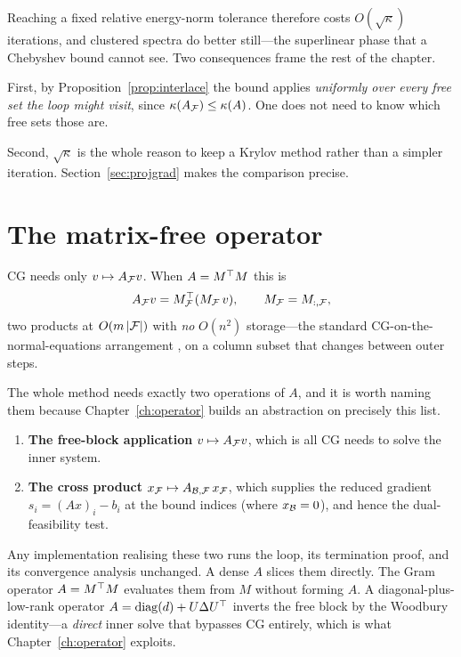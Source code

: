 Reaching a fixed relative energy-norm tolerance therefore costs $O(\sqrt\kappa)$
iterations, and clustered spectra do better still---the superlinear phase that a
Chebyshev bound cannot see. Two consequences frame the rest of the chapter.

First, by Proposition~\ref{prop:interlace} the bound applies \emph{uniformly over
every free set the loop might visit}, since $\kappa(A_{\mathcal{F}}) \le \kappa(A)$. One
does not need to know which free sets those are.

Second, $\sqrt\kappa$ is the whole reason to keep a Krylov method rather than a
simpler iteration. Section~\ref{sec:projgrad} makes the comparison precise.

\section{The matrix-free operator}
\label{sec:operator-two}

CG needs only $v \mapsto A_{\mathcal{F}} v$. When $A = M^{\top} M$ this is
\[
  A_{\mathcal{F}} v = M_{\mathcal{F}}^{\top}(M_{\mathcal{F}}\,v), \qquad M_{\mathcal{F}} = M_{:,\mathcal{F}},
\]
two products at $O(m\,|\mathcal{F}|)$ with \emph{no} $O(n^2)$ storage---the standard
CG-on-the-normal-equations arrangement \cite{golub2013,paige1975}, on a column
subset that changes between outer steps.

The whole method needs exactly two operations of $A$, and it is worth naming them
because Chapter~\ref{ch:operator} builds an abstraction on precisely this list.

\begin{enumerate}
\item \textbf{The free-block application} $v \mapsto A_{\mathcal{F}} v$, which is all CG
      needs to solve the inner system.
\item \textbf{The cross product}
      $x_{\mathcal{F}} \mapsto A_{\mathcal{B},\mathcal{F}}\,x_{\mathcal{F}}$, which supplies the reduced
      gradient $s_i = (Ax)_i - b_i$ at the bound indices (where $x_{\mathcal{B}} = 0$),
      and hence the dual-feasibility test.
\end{enumerate}

Any implementation realising these two runs the loop, its termination proof, and its
convergence analysis unchanged. A dense $A$ slices them directly. The Gram operator
$A = M^{\top} M$ evaluates them from $M$ without forming $A$. A diagonal-plus-low-rank
operator $A = \operatorname{diag}(d) + U\Delta U^{\top}$ inverts the free block by the Woodbury
identity---a \emph{direct} inner solve that bypasses CG entirely, which is what
Chapter~\ref{ch:operator} exploits.

